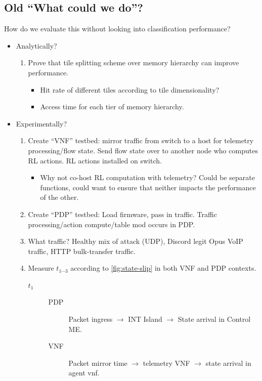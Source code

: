 \documentclass[sigconf,natbib=false]{acmart}
\begin{document}
\begin{appendices}
	\section{Old ``What could we do''?}
	How do we evaluate this without looking into classification performance?
	\begin{itemize}
		\item Analytically?
		\begin{enumerate}
			\item Prove that tile splitting scheme over memory hierarchy can improve performance.
			\begin{itemize}
				\item Hit rate of different tiles according to tile dimensionality?
				\item Access time for each tier of memory hierarchy.
			\end{itemize}
		\end{enumerate}
		\item Experimentally?
		\begin{enumerate}
			\item Create ``VNF'' testbed: mirror traffic from switch to a host for telemetry processing/flow state. Send flow state over to another node who computes RL actions. RL actions installed on switch.
			\begin{itemize}
				\item Why not co-host RL computation with telemetry? Could be separate functions, could want to ensure that neither impacts the performance of the other.
			\end{itemize}
			\item Create ``PDP'' testbed: Load firmware, pass in traffic. Traffic processing/action compute/table mod occurs in PDP.
			\item What traffic? Healthy mix of attack (UDP), Discord legit Opus VoIP traffic, HTTP bulk-transfer traffic.
			\item Measure $t_{1 \cdots 3}$ according to \cref{fig:state-slip} in both VNF and PDP contexts.
			\begin{description}
				\item[$t_1$]
				\begin{description}
					\item[PDP] Packet ingress $\rightarrow$ INT Island $\rightarrow$ State arrival in Control ME.
					\item[VNF] Packet mirror time $\rightarrow$ telemetry VNF $\rightarrow$ state arrival in agent vnf.
				\end{description}
				

\end{description}
\end{enumerate}
\end{itemize}
\end{appendices}
\end{document}
